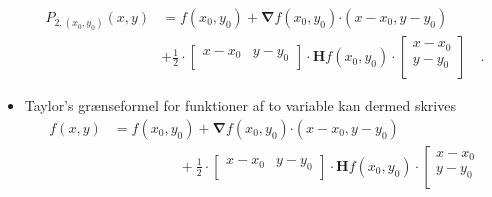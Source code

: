 \begin{summary}
\begin{itemize}
\begin{equation}
\begin{aligned}
P_{2, (x_{0}, y_{0})}(x,y) &= f(x_{0}, y_{0}) + \bm{\nabla}f(x_{0}, y_{0}) \bm{\cdot} (x-x_{0}, y-y_{0}) \\
&+ \frac{1}{2}\cdot \left[
                                          \begin{array}{cc}
                                            x-x_{0} & y-y_{0} \\
                                          \end{array}
                                        \right] \cdot \bm{H}f(x_{0}, y_{0})\cdot \left[
                                                                                   \begin{array}{c}
                                                                                         x-x_{0}  \\
                                                                                         y-y_{0}  \\
                                                                                   \end{array}                                                                                \right] \quad .
\end{aligned}
\end{equation}
\item Taylor's grænseformel for funktioner af to variable kan dermed skrives
\begin{equation}
\begin{aligned}
f(x,y) &= f(x_{0}, y_{0}) + \bm{\nabla}f(x_{0}, y_{0}) \bm{\cdot} (x-x_{0}, y-y_{0}) \\
&\phantom{abcdefghij}+ \frac{1}{2}\cdot \left[
                                          \begin{array}{cc}
                                            x-x_{0} & y-y_{0} \\
                                          \end{array}
                                        \right] \cdot \bm{H}f(x_{0}, y_{0})\cdot \left[
                                                                                   \begin{array}{c}
                                                                                         x-x_{0}  \\
                                                                                         y-y_{0}  \\

\end{array}
\end{aligned}
\end{equation}
\end{itemize}
\end{summary}
